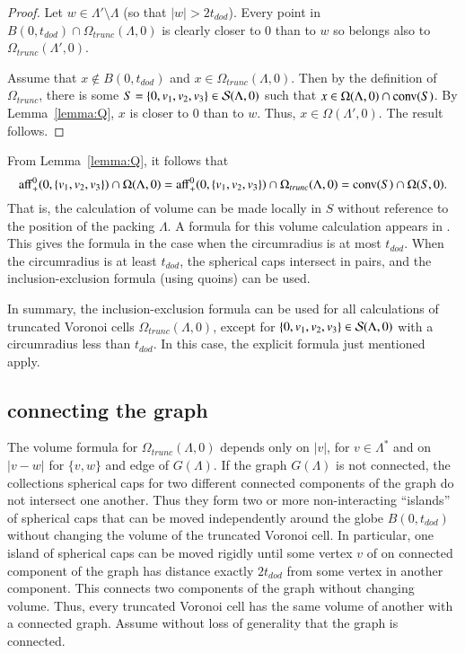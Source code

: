 \begin{proof} Let $w\in \Lambda'\setminus\Lambda$ (so that  $|w|>2t_{dod}$).
Every point in $B(0,t_{dod})\cap \Omega_{trunc}(\Lambda,0)$ 
is clearly closer to $0$ than to $w$ so
belongs also to $\Omega_{trunc}(\Lambda',0)$.

Assume that $x\not\in B(0,t_{dod})$ and $x\in \Omega_{trunc}(\Lambda,0)$.
Then by the definition of $\Omega_{trunc}$,
there is some $S=\{0,v_1,v_2,v_3\}\in {\mathcal S}(\Lambda,0)$ such that
$x\in \Omega(\Lambda,0)\cap {\operatorname{conv}}(S)$.  By Lemma~\ref{lemma:Q},
$x$ is closer to $0$ than to $w$.  Thus, $x\in\Omega(\Lambda',0)$.
The result follows.
\end{proof}

From Lemma~\ref{lemma:Q}, it follows that
\begin{equation}\label{eqn:omega-3}
{\operatorname{aff}}^0_+(0,\{v_1,v_2,v_3\}) \cap \Omega(\Lambda,0) = 
{\operatorname{aff}}^0_+(0,\{v_1,v_2,v_3\}) \cap \Omega_{trunc}(\Lambda,0) = 
{\operatorname{conv}}(S)\cap\Omega(S,0).
\end{equation}
That is, the calculation of volume can be made locally in $S$ without
reference to the position of the packing $\Lambda$.
A formula for this volume calculation appears in 
\cite[\S8.6.3]{Part1}.  This gives the formula in the case
when the circumradius is at most $t_{dod}$.  When the circumradius
is at least $t_{dod}$, the spherical caps intersect in pairs,
and the inclusion-exclusion formula (using quoins)
can be used.

In summary, the inclusion-exclusion formula can be used for all
calculations of truncated Voronoi cells $\Omega_{trunc}(\Lambda,0)$,
except for $\{0,v_1,v_2,v_3\}\in {\mathcal S}(\Lambda,0)$ with
a circumradius less than $t_{dod}$.  In this case, 
the explicit formula just mentioned apply.

\subsection{connecting the graph}

The volume formula for $\Omega_{trunc}(\Lambda,0)$
depends only on $|v|$, for $v\in\Lambda^*$ and on
$|v-w|$ for $\{v,w\}$ and edge of $G(\Lambda)$.
If the graph $G(\Lambda)$ is not connected, the
collections spherical caps for two different connected components
of the graph do not intersect one another.  Thus they form
two or more non-interacting ``islands'' of spherical caps that
can be moved independently around the globe $B(0,t_{dod})$
without changing the volume of
the truncated Voronoi cell.  In particular, one island of spherical
caps can be moved rigidly until some vertex $v$ of on connected
component of the graph has distance exactly $2t_{dod}$ from some
vertex in another component.  This connects two components of the
graph without changing volume.  Thus, every truncated Voronoi cell
has the same volume of another with a connected graph.  
Assume without loss of generality that the graph is connected.

